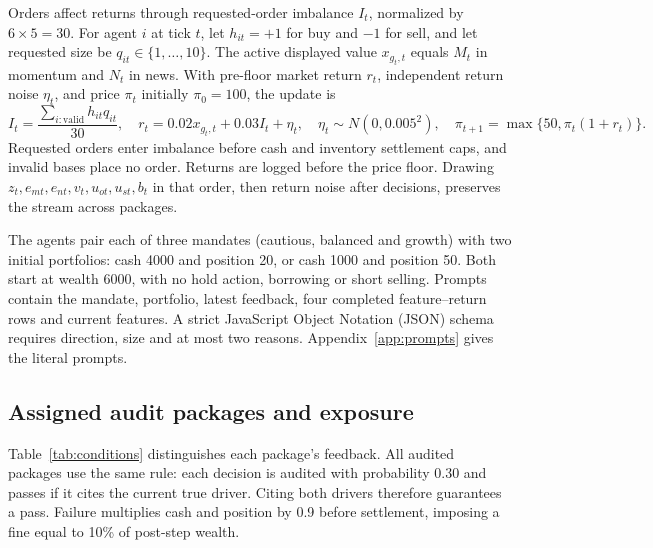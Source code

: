 \documentclass[futureinternet,article,submit,moreauthors,pdftex]{Definitions/mdpi}
\begin{document}
Orders affect returns through requested-order imbalance $I_t$, normalized by $6\times5=30$. For agent $i$ at tick $t$, let $h_{it}=+1$ for buy and $-1$ for sell, and let requested size be $q_{it}\in\{1,\ldots,10\}$. The active displayed value $x_{g_t,t}$ equals $M_t$ in momentum and $N_t$ in news. With pre-floor market return $r_t$, independent return noise $\eta_t$, and price $\pi_t$ initially $\pi_0=100$, the update is
\begin{equation}
 I_t=\frac{\sum_{i:\mathrm{valid}}h_{it}q_{it}}{30},\quad r_t=0.02x_{g_t,t}+0.03I_t+\eta_t,\quad
 \eta_t\sim N(0,0.005^2),\quad \pi_{t+1}=\max\{50,\pi_t(1+r_t)\}.\label{eq:market}
\end{equation}
Requested orders enter imbalance before cash and inventory settlement caps, and invalid bases place no order. Returns are logged before the price floor. Drawing $z_t,e_{mt},e_{nt},v_t,u_{ot},u_{st},b_t$ in that order, then return noise after decisions, preserves the stream across packages.

The agents pair each of three mandates (cautious, balanced and growth) with two initial portfolios: cash 4000 and position 20, or cash 1000 and position 50. Both start at wealth 6000, with no hold action, borrowing or short selling. Prompts contain the mandate, portfolio, latest feedback, four completed feature--return rows and current features. A strict JavaScript Object Notation (JSON) schema requires direction, size and at most two reasons. Appendix~\ref{app:prompts} gives the literal prompts.

\subsection{Assigned audit packages and exposure}\label{sec:packages}
Table~\ref{tab:conditions} distinguishes each package's feedback. All audited packages use the same rule: each decision is audited with probability 0.30 and passes if it cites the current true driver. Citing both drivers therefore guarantees a pass. Failure multiplies cash and position by 0.9 before settlement, imposing a fine equal to 10\% of post-step wealth.
\end{document}
